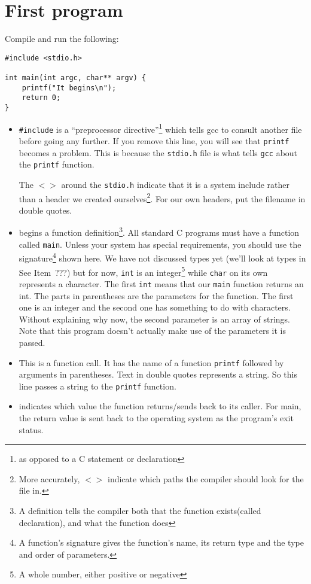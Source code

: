 
\chapter{First program}
\lstset{numbers=left, showstringspaces=false, frame=l}



Compile and run the following:
\begin{lstlisting}
#include <stdio.h>

int main(int argc, char** argv) {
    printf("It begins\n");
    return 0;
}
\end{lstlisting}

\begin{itemize}
 \item[1] \lstinline!#include! is a ``preprocessor directive''\footnote{as opposed to a C statement or declaration} which tells gcc to 
 consult another file before going any further.  If you remove this line, you will see that \texttt{printf} becomes a problem.
 This is because the \texttt{stdio.h} file is what tells \texttt{gcc} about the \texttt{printf} function.
 
 The $<>$ around the \texttt{stdio.h} indicate that it is a system include rather than a header we created ourselves\footnote{
 More accurately, $<>$ indicate which paths the compiler should look for the file in.}.
 For our own headers, put the filename in double quotes.
 
 \item[3] begins a function definition\footnote{A definition tells the compiler both that the function exists(called declaration), and what the function does}.
 All standard C programs must have a function called \texttt{main}.
 Unless your system has special requirements, you should use the signature\footnote{A function's signature gives the function's name, its return type and the type and order of parameters.} shown here.
 We have not discussed types yet (we'll look at types in See Item~???) but for now, \texttt{int} is an 
 integer\footnote{A whole number, either positive or negative} while \texttt{char} on its own represents a character.
 The first \texttt{int} means that our \texttt{main} function returns an int.
 The parts in parentheses are the parameters for the function.
 The first one is an integer and the second one has something to do with characters.
 Without explaining why now, the second parameter is an array of strings.
 Note that this program doesn't actually make use of the parameters it is passed.
 
 \item[4] This is a function call. It has the name of a function \texttt{printf} followed by arguments in parentheses.
 Text in double quotes represents a string. 
 So this line passes a string to the \texttt{printf} function.
 
 \item[5] indicates which value the function returns/sends back to its caller.
 For main, the return value is sent back to the operating system as the program's exit status.
\end{itemize}

